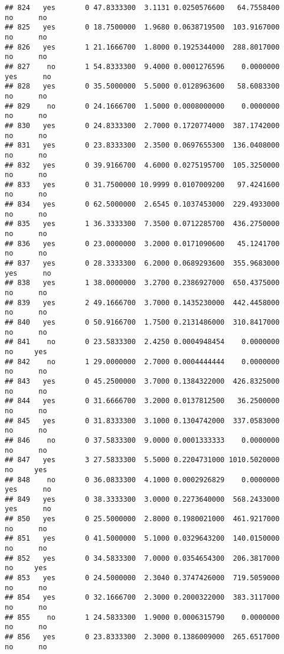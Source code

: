 \documentclass[]{article}
\begin{document}
\begin{verbatim}
## 824   yes       0 47.8333300  3.1131 0.0250576600   64.7558400    no      no
## 825   yes       0 18.7500000  1.9680 0.0638719500  103.9167000    no      no
## 826   yes       1 21.1666700  1.8000 0.1925344000  288.8017000    no      no
## 827    no       1 54.8333300  9.4000 0.0001276596    0.0000000   yes      no
## 828   yes       0 35.5000000  5.5000 0.0128963600   58.6083300    no      no
## 829    no       0 24.1666700  1.5000 0.0008000000    0.0000000    no      no
## 830   yes       0 24.8333300  2.7000 0.1720774000  387.1742000    no      no
## 831   yes       0 23.8333300  2.3500 0.0697655300  136.0408000    no      no
## 832   yes       0 39.9166700  4.6000 0.0275195700  105.3250000    no      no
## 833   yes       0 31.7500000 10.9999 0.0107009200   97.4241600    no      no
## 834   yes       0 62.5000000  2.6545 0.1037453000  229.4933000    no      no
## 835   yes       1 36.3333300  7.3500 0.0712285700  436.2750000    no      no
## 836   yes       0 23.0000000  3.2000 0.0171090600   45.1241700    no      no
## 837   yes       0 28.3333300  6.2000 0.0689293600  355.9683000   yes      no
## 838   yes       1 38.0000000  3.2700 0.2386927000  650.4375000    no      no
## 839   yes       2 49.1666700  3.7000 0.1435230000  442.4458000    no      no
## 840   yes       0 50.9166700  1.7500 0.2131486000  310.8417000    no      no
## 841    no       0 23.5833300  2.4250 0.0004948454    0.0000000    no     yes
## 842    no       1 29.0000000  2.7000 0.0004444444    0.0000000    no      no
## 843   yes       0 45.2500000  3.7000 0.1384322000  426.8325000    no      no
## 844   yes       0 31.6666700  3.2000 0.0137812500   36.2500000    no      no
## 845   yes       0 31.8333300  3.1000 0.1304742000  337.0583000    no      no
## 846    no       0 37.5833300  9.0000 0.0001333333    0.0000000    no      no
## 847   yes       3 27.5833300  5.5000 0.2204731000 1010.5020000    no     yes
## 848    no       0 36.0833300  4.1000 0.0002926829    0.0000000   yes      no
## 849   yes       0 38.3333300  3.0000 0.2273640000  568.2433000   yes      no
## 850   yes       0 25.5000000  2.8000 0.1980021000  461.9217000    no      no
## 851   yes       0 41.5000000  5.1000 0.0329643200  140.0150000    no      no
## 852   yes       0 34.5833300  7.0000 0.0354654300  206.3817000    no     yes
## 853   yes       0 24.5000000  2.3040 0.3747426000  719.5059000    no      no
## 854   yes       0 32.1666700  2.3000 0.2000322000  383.3117000    no      no
## 855    no       1 24.5833300  1.9000 0.0006315790    0.0000000    no      no
## 856   yes       0 23.8333300  2.3000 0.1386009000  265.6517000    no      no

\end{verbatim}
\end{document}
